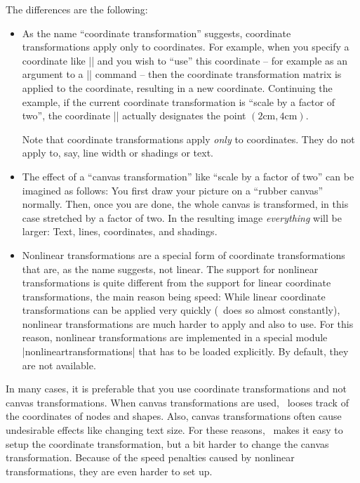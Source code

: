 The differences are the following:
%
\begin{itemize}
    \item As the name ``coordinate transformation'' suggests, coordinate
        transformations apply only to coordinates. For example, when you
        specify a coordinate like |\pgfpoint{1cm}{2cm}| and you wish to ``use''
        this coordinate -- for example as an argument to a |\pgfpathmoveto|
        command -- then the coordinate transformation matrix is applied to the
        coordinate, resulting in a new coordinate. Continuing the example, if
        the current coordinate transformation is ``scale by a factor of two'',
        the coordinate |\pgfpoint{1cm}{2cm}| actually designates the point
        $(2\mathrm{cm},4\mathrm{cm})$.

        Note that coordinate transformations apply \emph{only} to coordinates.
        They do not apply to, say, line width or shadings or text.
    \item The effect of a ``canvas transformation'' like ``scale by a factor of
        two'' can be imagined as follows: You first draw your picture on a
        ``rubber canvas'' normally. Then, once you are done, the whole canvas
        is transformed, in this case stretched by a factor of two. In the
        resulting image \emph{everything} will be larger: Text, lines,
        coordinates, and shadings.
    \item Nonlinear transformations are a special form of coordinate
        transformations that are, as the name suggests, not linear. The support
        for nonlinear transformations is quite different from the support for
        linear coordinate transformations, the main reason being speed: While
        linear coordinate transformations can be applied very quickly
        (\pgfname\ does so almost constantly), nonlinear transformations are
        much harder to apply and also to use. For this reason, nonlinear
        transformations are implemented in a special module
        |nonlineartransformations| that has to be loaded explicitly. By
        default, they are not available.
\end{itemize}

In many cases, it is preferable that you use coordinate transformations and not
canvas transformations. When canvas transformations are used, \pgfname\ looses
track of the coordinates of nodes and shapes. Also, canvas transformations
often cause undesirable effects like changing text size. For these reasons,
\pgfname\ makes it easy to setup the coordinate transformation, but a bit
harder to change the canvas transformation. Because of the speed penalties
caused by nonlinear transformations, they are even harder to set up.


